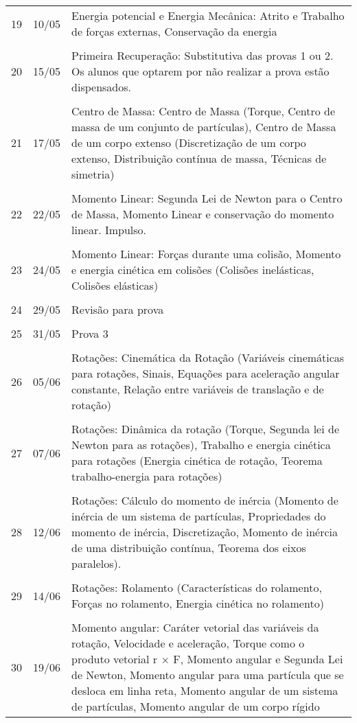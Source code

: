 \begin{center}
\begin{longtable}{ccp{70mm}}
19 & 10/05 & Energia potencial e Energia Mecânica: Atrito e Trabalho de forças externas, Conservação da energia \\
\\
20 & 15/05 & Primeira Recuperação: Substitutiva das provas 1 ou 2. Os alunos que optarem por não realizar a prova estão dispensados. \\
\\
21 & 17/05 & Centro de Massa: Centro de Massa (Torque, Centro de massa de um conjunto de partículas), Centro de Massa de um corpo extenso (Discretização de um corpo extenso, Distribuição contínua de massa, Técnicas de simetria) \\
\\
22 & 22/05 & Momento Linear: Segunda Lei de Newton para o Centro de Massa, Momento Linear e conservação do momento linear. Impulso. \\
\\
23 & 24/05 & Momento Linear: Forças durante uma colisão, Momento e energia cinética em colisões (Colisões inelásticas, Colisões elásticas) \\
\\
24 & 29/05 & Revisão para prova \\
\\
25 & 31/05 & Prova 3 \\
\\
26 & 05/06 & Rotações: Cinemática da Rotação (Variáveis cinemáticas para rotações, Sinais, Equações para aceleração angular constante, Relação entre variáveis de translação e de rotação) \\
\\
27 & 07/06 & Rotações: Dinâmica da rotação (Torque, Segunda lei de Newton para as rotações), Trabalho e energia cinética para rotações (Energia cinética de rotação, Teorema trabalho-energia para rotações) \\
\\
28 & 12/06 & Rotações: Cálculo do momento de inércia (Momento de inércia de um sistema de partículas, Propriedades do momento de inércia, Discretização, Momento de inércia de uma distribuição contínua, Teorema dos eixos paralelos). \\
\\
29 & 14/06 & Rotações: Rolamento (Características do rolamento, Forças no rolamento, Energia cinética no rolamento) \\
\\
30 & 19/06 & Momento angular: Caráter vetorial das variáveis da rotação, Velocidade e aceleração, Torque como o produto vetorial r × F, Momento angular e Segunda Lei de Newton, Momento angular para uma partícula que se desloca em linha reta, Momento angular de um sistema de partículas, Momento angular de um corpo rígido \\

\end{longtable}
\end{center}
